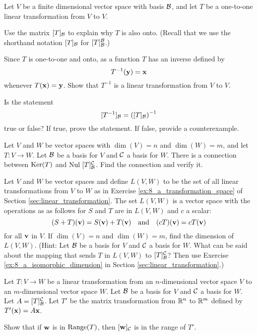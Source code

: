 \item Let $V$ be a finite dimensional vector space with basis $\mathcal{B}$, and let $T$ be a one-to-one linear transformation from $V$ to $V$.
	\ba
	\item Use the matrix $[T]_{\mathcal{B}}$ to explain why $T$ is also onto. (Recall that we use the shorthand notation $[T]_{\mathcal{B}}$ for $[T]_{\mathcal{B}}^{\mathcal{B}}$.)
	\item Since $T$ is one-to-one and onto, as a function $T$ has an inverse defined by 
\[T^{-1}(\mathbf{y}) = \mathbf{x}\]
whenever $T(\mathbf{x}) = \mathbf{y}$. Show that $T^{-1}$ is a linear transformation from $V$ to $V$.
	\item Is the statement
\[[T^{-1}]_{\mathcal{B}} = \left([T]_{\mathcal{B}}\right)^{-1} \]
true or false? If true, prove the statement. If false, provide a counterexample. 
	\ea

\item \label{ex:8_b_Ker_Nul} Let $V$ and $W$ be vector spaces with $\dim(V) = n$ and $\dim(W) = m$, and let $T : V \to W$. Let $\mathcal{B}$ be a basis for $V$ and $\mathcal{C}$ a basis for $W$. There is a connection between $\text{Ker}(T)$ and $\text{Nul } [T]_{\mathcal{B}}^{\mathcal{C}}$. Find the connection and verify it.

\item \label{ex:8_b_transformation_space} Let $V$ and $W$ be vector spaces and define $L(V,W)$ to be the set of all linear transformations from $V$ to $W$ as in Exercise \ref{ex:8_a_transformation_space} of Section \ref{sec:linear_transformation}. The set $L(V,W)$ is a vector space with the operations as as follows for $S$ and $T$ are in $L(V,W)$ and $c$ a scalar: 
\[(S+T)(\vv) = S(\vv) + T(\vv) \ \ \text{ and } \ \ (cT)(\vv) = cT(\vv)\]
for all $\mathbf{v}$ in $V$. If $\dim(V) = n$ and $\dim(W) = m$, find the dimension of $L(V,W)$. (Hint: Let $\mathcal{B}$ be a basis for $V$ and $\mathcal{C}$ a basis for $W$. What can be said about the mapping that sends $T$ in $L(V,W)$ to $[T]_{\mathcal{B}}^{\mathcal{C}}$? Then use Exercise \ref{ex:8_a_isomorphic_dimension} in Section \ref{sec:linear_transformation}.) 

\item \label{ex:8_b_range_matrix} Let $T : V \to W$ be a linear transformation from an $n$-dimensional vector space $V$ to an $m$-dimensional vector space $W$. Let $\mathcal{B}$ be a basis for $V$ and $\mathcal{C}$ a basis for $W$. Let $A = [T]_{\mathcal{B}}^{\mathcal{C}}$. Let $T'$ be the matrix transformation from $\mathbb{R}^n$ to $\mathbb{R}^m$ defined by $T'(\mathbf{x}) = A\mathbf{x}$. 
\ba
\item Show that if $\mathbf{w}$ is in $\text{Range}(T)$, then $[\mathbf{w}]_{\mathcal{C}}$ is in the range of $T'$. 


